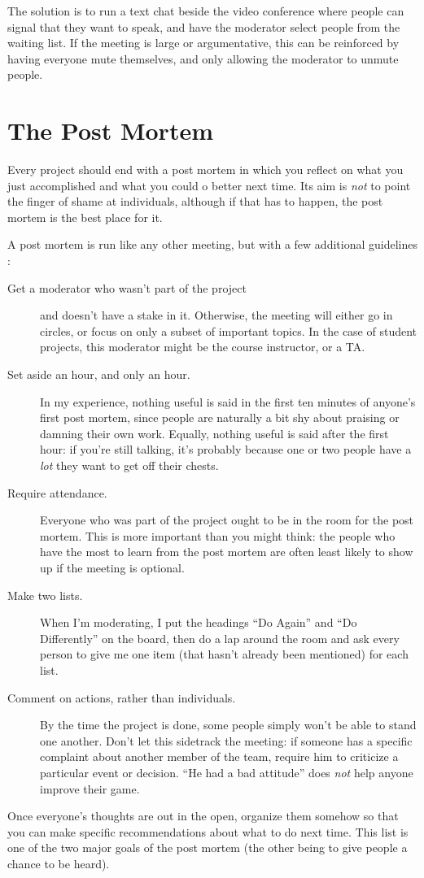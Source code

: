 The solution is to run a text chat beside the video conference where
people can signal that they want to speak, and have the moderator select
people from the waiting list. If the meeting is large or argumentative,
this can be reinforced by having everyone mute themselves, and only
allowing the moderator to unmute people.

\section{The Post Mortem}\label{the-post-mortem}

Every project should end with a post mortem in which you reflect on what
you just accomplished and what you could o better next time. Its aim is
\emph{not} to point the finger of shame at individuals, although if that has
to happen, the post mortem is the best place for it.

A post mortem is run like any other meeting, but with a few additional
guidelines \cite{Derb2006}:

\begin{description}
\item[Get a moderator who wasn't part of the project]
and doesn't have a stake in it. Otherwise, the meeting will either
go in circles, or focus on only a subset of important topics. In the
case of student projects, this moderator might be the course
instructor, or a TA.
\item[Set aside an hour, and only an hour.]
In my experience, nothing useful is said in the first ten minutes of
anyone's first post mortem, since people are naturally a bit shy
about praising or damning their own work. Equally, nothing useful is
said after the first hour: if you're still talking, it's probably
because one or two people have a \emph{lot} they want to get off their
chests.
\item[Require attendance.]
Everyone who was part of the project ought to be in the room for the
post mortem. This is more important than you might think: the people
who have the most to learn from the post mortem are often least
likely to show up if the meeting is optional.
\item[Make two lists.]
When I'm moderating, I put the headings ``Do Again'' and ``Do
Differently'' on the board, then do a lap around the room and ask
every person to give me one item (that hasn't already been
mentioned) for each list.
\item[Comment on actions, rather than individuals.]
By the time the project is done, some people simply won't be able to
stand one another. Don't let this sidetrack the meeting: if someone
has a specific complaint about another member of the team, require
him to criticize a particular event or decision. ``He had a bad
attitude'' does \emph{not} help anyone improve their game.
\end{description}

Once everyone's thoughts are out in the open, organize them somehow so
that you can make specific recommendations about what to do next time.
This list is one of the two major goals of the post mortem (the other
being to give people a chance to be heard).
